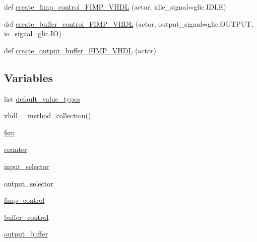 \begin{DoxyCompactItemize}
\item 
def \hyperlink{namespacesylva_1_1code__generation_1_1sylva__fimp__lib_a2b2a9cfce91fc3139513beb93c8307ce}{create\+\_\+fimp\+\_\+control\+\_\+\+F\+I\+M\+P\+\_\+\+V\+H\+DL} (actor, idle\+\_\+signal=glic.\+I\+D\+LE)
\item 
def \hyperlink{namespacesylva_1_1code__generation_1_1sylva__fimp__lib_a54d6b050b1d37fc82d1a6fdc8090687c}{create\+\_\+buffer\+\_\+control\+\_\+\+F\+I\+M\+P\+\_\+\+V\+H\+DL} (actor, output\+\_\+signal=glic.\+O\+U\+T\+P\+UT, io\+\_\+signal=glic.\+IO)
\item 
def \hyperlink{namespacesylva_1_1code__generation_1_1sylva__fimp__lib_a66cabf05c0d2dc8b7957560a0075b5d8}{create\+\_\+output\+\_\+buffer\+\_\+\+F\+I\+M\+P\+\_\+\+V\+H\+DL} (actor)
\end{DoxyCompactItemize}
\subsection*{Variables}
\begin{DoxyCompactItemize}
\item 
list \hyperlink{namespacesylva_1_1code__generation_1_1sylva__fimp__lib_aa8422a786f50398770d5f045867640e4}{default\+\_\+value\+\_\+types}
\item 
\hyperlink{namespacesylva_1_1code__generation_1_1sylva__fimp__lib_a04e5d8b89872e8bfea99c717c935813a}{vhdl} = \hyperlink{classsylva_1_1code__generation_1_1sylva__fimp__lib_1_1method__collection}{method\+\_\+collection}()
\item 
\hyperlink{namespacesylva_1_1code__generation_1_1sylva__fimp__lib_a15636f64b8e625b53867bf274cdeef26}{fsm}
\item 
\hyperlink{namespacesylva_1_1code__generation_1_1sylva__fimp__lib_af6787c82713f43b5d369232721d15a2e}{counter}
\item 
\hyperlink{namespacesylva_1_1code__generation_1_1sylva__fimp__lib_a74d6af9218ba9cde80f566049ceaef87}{input\+\_\+selector}
\item 
\hyperlink{namespacesylva_1_1code__generation_1_1sylva__fimp__lib_acdd66348da78fbcf5d4f7b3b0d15f365}{output\+\_\+selector}
\item 
\hyperlink{namespacesylva_1_1code__generation_1_1sylva__fimp__lib_a358e7e3dda7af768f0af97eb31d6ef68}{fimp\+\_\+control}
\item 
\hyperlink{namespacesylva_1_1code__generation_1_1sylva__fimp__lib_a9f1e1b1e1118dcbfe55055475a342229}{buffer\+\_\+control}
\item 
\hyperlink{namespacesylva_1_1code__generation_1_1sylva__fimp__lib_afe50e5b36b5712d25b56338e042cfd92}{output\+\_\+buffer}
\end{DoxyCompactItemize}


